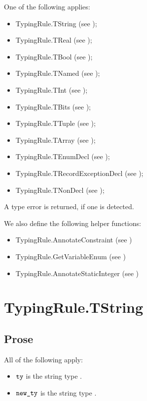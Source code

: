 \documentclass{book}
\begin{document}
One of the following applies:
\begin{itemize}
  \item TypingRule.TString (see );
  \item TypingRule.TReal (see );
  \item TypingRule.TBool (see );
  \item TypingRule.TNamed (see );
  \item TypingRule.TInt (see );
  \item TypingRule.TBits (see );
  \item TypingRule.TTuple (see );
  \item TypingRule.TArray (see );
  \item TypingRule.TEnumDecl (see );
  \item TypingRule.TRecordExceptionDecl (see );
  \item TypingRule.TNonDecl (see );
\end{itemize}
A type error is returned, if one is detected.

We also define the following helper functions:
\begin{itemize}
  \item TypingRule.AnnotateConstraint (see )
  \item TypingRule.GetVariableEnum (see )
  \item TypingRule.AnnotateStaticInteger (see )
\end{itemize}

\section{TypingRule.TString \label{sec:TypingRule.TString}}

\subsection{Prose}
All of the following apply:
\begin{itemize}
  \item $\texttt{ty}$ is the string type \TString.
  \item $\texttt{new\_ty}$ is the string type \TString.
\end{itemize}
\end{document}
